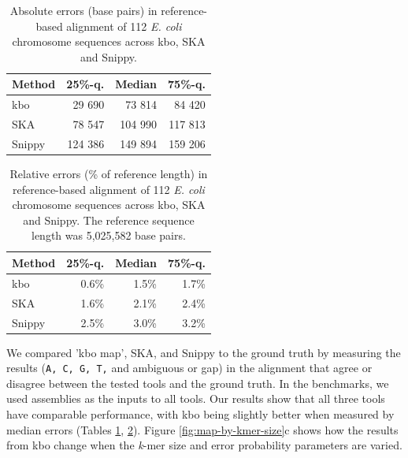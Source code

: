 \documentclass[unnumsec,webpdf,contemporary,large]{oup-authoring-template}%
\theoremstyle{thmstyleone}%
\theoremstyle{thmstyletwo}%
\theoremstyle{thmstylethree}%
\newcommand{\kbo}{{\sf kbo}}
\begin{document}
\begin{table}[]
\centering
\begin{tabular}{lrrr}
Method & 25\%-q.  & Median  & 75\%-q. \\
\hline
\kbo    & 29 690 & 73 814   & 84 420  \\
SKA    & 78 547 & 104 990 & 117 813 \\
Snippy  & 124 386 & 149 894 & 159 206  \\
\end{tabular}
\caption{Absolute errors (base pairs) in reference-based alignment of 112 \textit{E. coli} chromosome sequences across \kbo, SKA and Snippy.}
\label{map-absolute-error}
\end{table}
\begin{table}[]
\centering
\begin{tabular}{lrrr}
Method & 25\%-q.  & Median  & 75\%-q. \\
\hline
\kbo    & 0.6\% & 1.5\% & 1.7\%  \\
SKA    & 1.6\% & 2.1\% & 2.4\% \\
Snippy  & 2.5\% & 3.0\%   & 3.2\%  \\
\end{tabular}
\caption{Relative errors (\% of reference length) in reference-based alignment of 112 \textit{E. coli} chromosome sequences across \kbo, SKA and Snippy. The reference sequence length was 5,025,582 base pairs.}
\label{map-relative-error}
\end{table}

We compared 'kbo map', SKA\cite{derelle2024seamless}, and Snippy\cite{seemann2015snippy} to the ground truth by measuring the results ({\tt A, C, G, T,} and ambiguous or gap) in the alignment that agree or disagree between the tested tools and the ground truth. In the benchmarks, we used assemblies as the inputs to all tools. Our results show that all three tools have comparable performance, with {\sf kbo} being slightly better when measured by median errors (Tables \ref{map-absolute-error}, \ref{map-relative-error}). Figure \ref{fig:map-by-kmer-size}c shows how the results from {\sf kbo} change when the \emph{k}-mer size and error probability parameters are varied.
\end{document}

